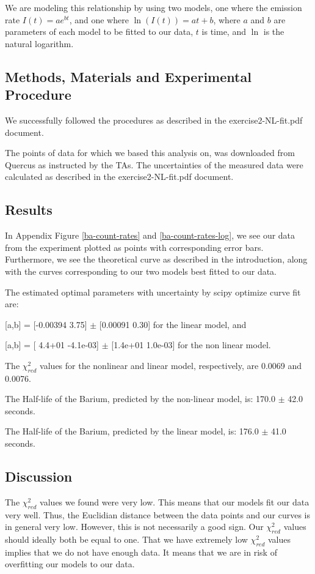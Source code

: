 \documentclass[letterpaper,12pt]{article}
\begin{document}
We are modeling this relationship by using two models, one where the emission rate 
$I(t) = ae^{bt}$, and one where $\ln(I(t)) = at+b$, 
where $a$ and $b$ are parameters of each model to be fitted to our data, 
$t$ is time, and $\ln$ is the natural logarithm.

\subsection{Methods, Materials and Experimental Procedure}

We successfully followed the procedures as described in the exercise2-NL-fit.pdf \cite{lab-manual-ex2}
document.

The points of data for which we based this analysis on, 
was downloaded from Quercus as instructed by the TAs. 
The uncertainties of the measured data were calculated as described 
in the exercise2-NL-fit.pdf \cite{lab-manual-ex2} document.

\subsection{Results}

In Appendix Figure \ref{ba-count-rates} and \ref{ba-count-rates-log}, we see our data from the experiment 
plotted as points with corresponding error bars. 
Furthermore, we see the theoretical curve as described in the introduction, 
along with the curves corresponding to our two models best fitted to our data. 

The estimated optimal parameters with uncertainty by scipy optimize curve fit are: 

[a,b] = [-0.00394 3.75] $\pm$ [0.00091 0.30] for the linear model, and

[a,b] = [ 4.4+01 -4.1e-03] $\pm$ [1.4e+01 1.0e-03] for the non linear model.

The $\chi^2_{red}$ values for the nonlinear and linear model, respectively, are 0.0069 and 0.0076.

The Half-life of the Barium, predicted by the non-linear model, is: 170.0 $\pm$ 42.0 seconds.

The Half-life of the Barium, predicted by the linear model, is: 176.0 $\pm$ 41.0 seconds.

\subsection{Discussion}

The $\chi^2_{red}$ values we found were very low. This means that our models 
fit our data very well. Thus, the Euclidian distance between the data points and 
our curves is in general very low. However, this is not necessarily a good sign. 
Our $\chi^2_{red}$ values should ideally both be equal to one. 
That we have extremely low $\chi^2_{red}$ values implies that we do not 
have enough data. It means that we are in risk of overfitting our models to our data.
\end{document}
